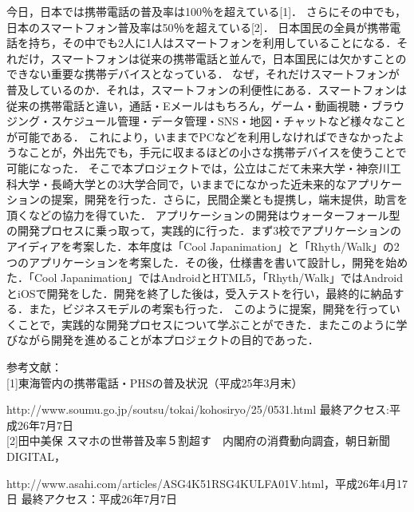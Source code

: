 \begin{jabstract}
今日，日本では携帯電話の普及率は100％を超えている[1]． さらにその中でも，日本のスマートフォン普及率は50％を超えている[2]． 日本国民の全員が携帯電話を持ち，その中でも2人に1人はスマートフォンを利用していることになる．それだけ，スマートフォンは従来の携帯電話と並んで，日本国民には欠かすことのできない重要な携帯デバイスとなっている．
なぜ，それだけスマートフォンが普及しているのか．それは，スマートフォンの利便性にある．スマートフォンは従来の携帯電話と違い，通話・Eメールはもちろん，ゲーム・動画視聴・ブラウジング・スケジュール管理・データ管理・SNS・地図・チャットなど様々なことが可能である．
これにより，いままでPCなどを利用しなければできなかったようなことが，外出先でも，手元に収まるほどの小さな携帯デバイスを使うことで可能になった．
そこで本プロジェクトでは，公立はこだて未来大学・神奈川工科大学・長崎大学との3大学合同で，いままでになかった近未来的なアプリケーションの提案，開発を行った．さらに，民間企業とも提携し，端末提供，助言を頂くなどの協力を得ていた．
アプリケーションの開発はウォーターフォール型の開発プロセスに乗っ取って，実践的に行った．まず3校でアプリケーションのアイディアを考案した．本年度は「Cool Japanimation」と「Rhyth/Walk」の2つのアプリケーションを考案した．その後，仕様書を書いて設計し，開発を始めた．「Cool Japanimation」ではAndroidとHTML5，「Rhyth/Walk」ではAndroidとiOSで開発をした．開発を終了した後は，受入テストを行い，最終的に納品する．また，ビジネスモデルの考案も行った．
このように提案，開発を行っていくことで，実践的な開発プロセスについて学ぶことができた．またこのように学びながら開発を進めることが本プロジェクトの目的であった．



参考文献：\\[1mm]
[1]東海管内の携帯電話・PHSの普及状況（平成25年3月末）
\par 
http://www.soumu.go.jp/soutsu/tokai/kohosiryo/25/0531.html
最終アクセス:平成26年7月7日
\\[1mm] 
[2]田中美保 スマホの世帯普及率５割超す　内閣府の消費動向調査，朝日新聞DIGITAL，
\par
http://www.asahi.com/articles/ASG4K51RSG4KULFA01V.html，平成26年4月17日 最終アクセス：平成26年7月7日

\end{jabstract}
